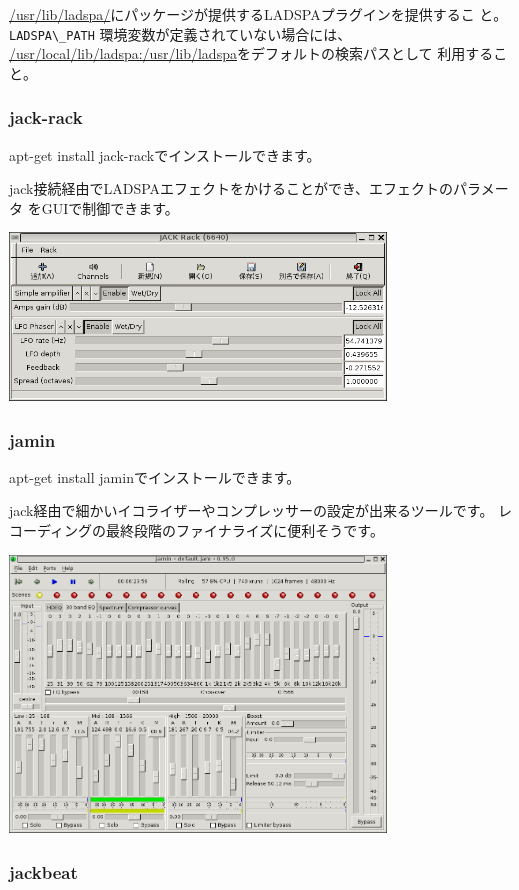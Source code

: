 \documentclass[mingoth,a4paper]{jsarticle}
\begin{document}
\url{/usr/lib/ladspa/}にパッケージが提供するLADSPAプラグインを提供するこ
と。\verb!LADSPA\_PATH! 環境変数が定義されていない場合には、
\url{/usr/local/lib/ladspa:/usr/lib/ladspa}をデフォルトの検索パスとして
利用すること。

\subsubsection{jack-rack}

apt-get install jack-rackでインストールできます。

jack接続経由でLADSPAエフェクトをかけることができ、エフェクトのパラメータ
をGUIで制御できます。

\includegraphics[width=10cm]{image200602/jack-rack.png}

\subsubsection{jamin}

apt-get install jaminでインストールできます。

jack経由で細かいイコライザーやコンプレッサーの設定が出来るツールです。
レコーディングの最終段階のファイナライズに便利そうです。

\includegraphics[width=10cm]{image200602/jamin.png}

\subsubsection{jackbeat}
\end{document}
